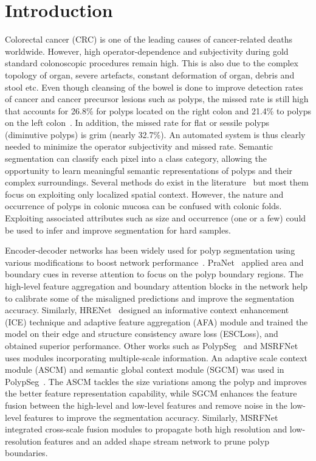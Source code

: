 \documentclass[runningheads]{llncs}
\begin{document}
\section{Introduction}
Colorectal cancer (CRC) is one of the leading causes of cancer-related deaths~\cite{sung2021global} worldwide. However, high operator-dependence and subjectivity during gold standard colonoscopic procedures remain high. This is also due to the complex topology of organ, severe artefacts, constant deformation of organ, debris and stool etc. Even though cleansing of the bowel is done to improve detection rates of cancer and cancer precursor lesions such as polyps, the missed rate is still high that accounts for 26.8\% for polyps located on the right colon and 21.4\% to polyps on the left colon~\cite{kim2017miss,rex1997colonoscopic}. In addition, the missed rate for flat or sessile polyps (diminutive polyps) is grim (nearly 32.7\%). An automated system is thus clearly needed to minimize the operator subjectivity and missed rate. Semantic segmentation can classify each pixel into a class category, allowing the opportunity to learn meaningful semantic representations of polyps and their complex surroundings. Several methods do exist in the literature~\cite{fan2020pranet,jha2021real,shen2021hrenet} but most them focus on exploiting only localized spatial context. However, the nature and occurrence of polyps in colonic mucosa can be confused with colonic folds. Exploiting associated attributes such as size and occurrence (one or a few) could be used to infer and improve segmentation for hard samples.   

Encoder-decoder networks has been widely used for polyp segmentation using various modifications to boost network performance~\cite{fan2020pranet,jha2021real,shen2021hrenet}. PraNet~\cite{fan2020pranet} applied area and boundary cues in reverse attention to focus on the polyp boundary regions. The high-level feature aggregation and boundary attention blocks in the network help to calibrate some of the misaligned predictions and improve the segmentation accuracy. Similarly, HRENet~\cite{shen2021hrenet} designed an informative context enhancement (ICE) technique and adaptive feature aggregation (AFA) module and trained the model on their edge and structure consistency aware loss (ESCLoss), and obtained superior performance. Other works such as PolypSeg~\cite{zhong2020polypseg} and MSRFNet~\cite{srivastava2021msrf} uses modules incorporating multiple-scale information. An adaptive scale context module (ASCM) and semantic global context module (SGCM) was used in PolypSeg~\cite{zhong2020polypseg}. The ASCM tackles the size variations among the polyp and improves the better feature representation capability, while SGCM enhances the feature fusion between the high-level and low-level features and remove noise in the low-level features to improve the segmentation accuracy. Similarly, MSRFNet~\cite{srivastava2021msrf} integrated cross-scale fusion modules to propagate both high resolution and low-resolution features and an added shape stream network to prune polyp boundaries. 
\end{document}
